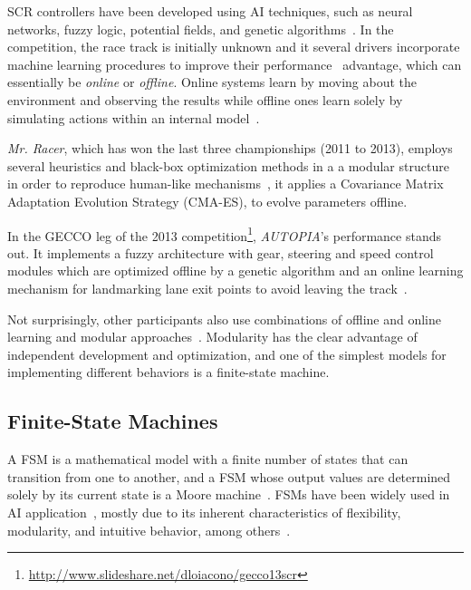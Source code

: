 
SCR controllers have been developed using AI techniques, such as neural networks, fuzzy logic, potential fields, and genetic algorithms~\cite{Loiacono:2012:LEA:2212908.2212953}. In the competition, the race track is initially unknown and it several drivers incorporate machine learning procedures to improve their performance~\cite{2009} advantage, which can essentially be \emph{online} or \emph{offline}. Online systems learn by moving about the environment and observing the results while offline ones learn solely by simulating actions within an internal model~\cite{mitchell_1997}.

\emph{Mr. Racer}, which has won the last three championships (2011 to 2013), employs several heuristics and black-box optimization methods in a a modular structure in order to reproduce human-like mechanisms~\cite{MrRacer}, it applies a Covariance Matrix Adaptation Evolution Strategy (CMA-ES), to evolve parameters offline.

In the GECCO leg of the 2013 competition\footnote{\url{http://www.slideshare.net/dloiacono/gecco13scr}}, \emph{AUTOPIA}'s performance stands out. It implements a fuzzy architecture with gear, steering and speed control modules which are optimized offline by a genetic algorithm and an online learning mechanism for landmarking lane exit points to avoid leaving the track~\cite{AUTOPIA}.

Not surprisingly, other participants also use combinations of offline and online learning and modular approaches~\cite{2009,DIEGO,Exp}. Modularity has the clear advantage of independent development and optimization\cite{MrRacer,AUTOPIA2009}, and one of the simplest models for implementing different behaviors is a finite-state machine.

\subsection{Finite-State Machines}%
A FSM is a mathematical model with a finite number of states that can transition from one to another, and a FSM whose output values are determined solely by its current state is a Moore machine~\cite{Ajzerman}. FSMs have been widely used in AI application~\cite{Millington:2006:FSM}, mostly due to its inherent characteristics of flexibility, modularity, and intuitive behavior, among others~\cite{Buckland:2005:AI}.

